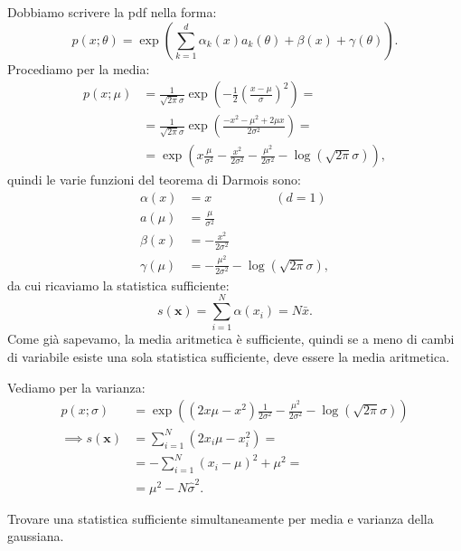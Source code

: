 \begin{solution}
	Dobbiamo scrivere la pdf nella forma:
	\begin{equation*}
		p(x;\theta)
		= \exp \left( \sum_{k=1}^d \alpha_k(x)a_k(\theta) + \beta(x) + \gamma(\theta) \right).
	\end{equation*}
	Procediamo per la media:
	\begin{align*}
		p(x;\mu)
		&= \frac1{\sqrt{2\pi}\sigma}
		\exp\left( -\frac12 \left(\frac{x-\mu}\sigma\right)^2 \right) = \\
		&= \frac1{\sqrt{2\pi}\sigma}
		\exp\left( \frac{-x^2-\mu^2+2\mu x}{2\sigma^2} \right) = \\
		&= \exp \left( x\frac\mu{\sigma^2} - \frac{x^2}{2\sigma^2}
		 - \frac{\mu^2}{2\sigma^2} - \log(\sqrt{2\pi}\sigma) \right),
	\end{align*}
	quindi le varie funzioni del teorema di Darmois sono:
	\begin{align*}
		\alpha(x) &= x \hspace{5em} (d = 1)\\
		a(\mu) &= \frac{\mu}{\sigma^2} \\
		\beta(x) &= - \frac{x^2}{2\sigma^2} \\
		\gamma(\mu) &= - \frac{\mu^2}{2\sigma^2} - \log(\sqrt{2\pi}\sigma),
	\end{align*}
	da cui ricaviamo la statistica sufficiente:
	\begin{equation*}
		s(\mathbf x)
		= \sum_{i=1}^N \alpha(x_i)
		= N\bar x.
	\end{equation*}
	Come già sapevamo, la media aritmetica è sufficiente,
	quindi se a meno di cambi di variabile esiste una sola statistica sufficiente,
	deve essere la media aritmetica.
	
	Vediamo per la varianza:
	\begin{align*}
		p(x;\sigma)
		&= \exp \left( (2x\mu-x^2)\frac1{2\sigma^2}
		- \frac{\mu^2}{2\sigma^2}
		-\log(\sqrt{2\pi}\sigma) \right) \\
		\implies s(\mathbf x)
		&= \sum_{i=1}^N (2x_i\mu-x_i^2) = \\
		&= -\sum_{i=1}^N (x_i-\mu)^2 + \mu^2 = \\
		&= \mu^2 - N\hat\sigma^2.
	\end{align*}
\end{solution}

\begin{exercise}
	Trovare una statistica sufficiente simultaneamente per media e varianza della gaussiana.
\end{exercise}

